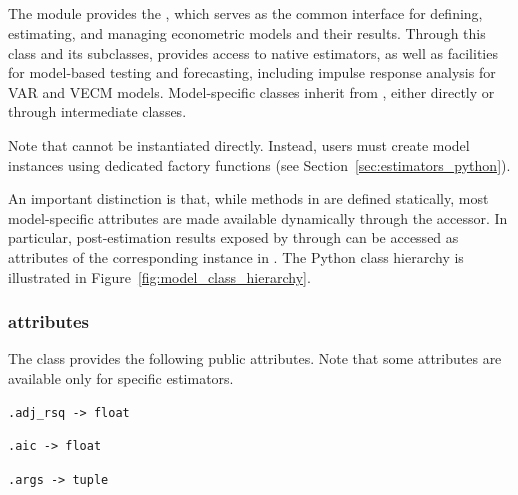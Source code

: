 \subsection[gretl.Model class]{\classpymodelnosp}\label{sec:class_py_model}
The \gretlpy module provides the \classpymodelnosp,
which serves as the common interface for defining,
estimating, and managing econometric models and their
results. Through this class and its subclasses, \gretlpy
provides access to native \lgretl estimators, as well as
facilities for model-based testing and forecasting,
including impulse response analysis for VAR and VECM models.
Model-specific classes inherit from \classpymodelnosp,
either directly or through intermediate classes.

Note that \classpymodel cannot be instantiated directly.
Instead, users must create model instances using dedicated
factory functions (see Section~\ref{sec:estimators_python}).

An important distinction is that, while methods in \gretlpy
are defined statically, most model-specific attributes are
made available dynamically through the 
accessor. In particular, post-estimation results exposed by
\gretl through  can be accessed as attributes
of the corresponding \classpymodel instance in \gretlpy.
The Python class hierarchy is illustrated in Figure~\ref{fig:model_class_hierarchy}.



\subsubsection{\classpymodelb attributes}

The \classpymodel class provides the following public attributes. Note that some attributes are available only for specific estimators.

\begin{lstlisting}[style=pythonstylefoot]
.adj_rsq -> float
\end{lstlisting}

\begin{lstlisting}[style=pythonstylefoot]
.aic -> float
\end{lstlisting}

\begin{lstlisting}[style=pythonstylefoot]
.args -> tuple
\end{lstlisting}

